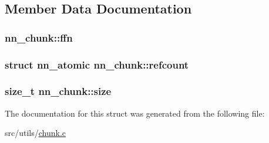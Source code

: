 \subsection{Member Data Documentation}
\subsubsection[{ffn}]{ nn\+\_\+chunk\+::ffn}\hypertarget{structnn__chunk_a902d9aa3b995457231f2e9e5694e93f3}{}\label{structnn__chunk_a902d9aa3b995457231f2e9e5694e93f3}
\subsubsection[{refcount}]{\setlength{\rightskip}{0pt plus 5cm}struct {\bf nn\+\_\+atomic} nn\+\_\+chunk\+::refcount}\hypertarget{structnn__chunk_a6d263535f4104d1e02e1b0e0b04e667c}{}\label{structnn__chunk_a6d263535f4104d1e02e1b0e0b04e667c}
\subsubsection[{size}]{\setlength{\rightskip}{0pt plus 5cm}size\+\_\+t nn\+\_\+chunk\+::size}\hypertarget{structnn__chunk_abf9a2795a02f86a19fe3db0db0a21106}{}\label{structnn__chunk_abf9a2795a02f86a19fe3db0db0a21106}


The documentation for this struct was generated from the following file\+:\begin{DoxyCompactItemize}
\item 
src/utils/\hyperlink{chunk_8c}{chunk.\+c}\end{DoxyCompactItemize}
